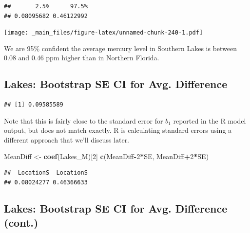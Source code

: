 \documentclass[]{book}
\newenvironment{Shaded}{\begin{snugshade}}{\end{snugshade}}
\newcommand{\KeywordTok}[1]{\textcolor[rgb]{0.13,0.29,0.53}{\textbf{#1}}}
\newcommand{\DecValTok}[1]{\textcolor[rgb]{0.00,0.00,0.81}{#1}}
\newcommand{\StringTok}[1]{\textcolor[rgb]{0.31,0.60,0.02}{#1}}
\newcommand{\OperatorTok}[1]{\textcolor[rgb]{0.81,0.36,0.00}{\textbf{#1}}}
\newcommand{\NormalTok}[1]{#1}
\begin{document}
\begin{verbatim}
##       2.5%      97.5% 
## 0.08095682 0.46122992
\end{verbatim}

\texttt{[image: \_main\_files/figure-latex/unnamed-chunk-240-1.pdf]}

We are 95\% confident the average mercury level in Southern Lakes is
between 0.08 and 0.46 ppm higher than in Northern Florida.

\subsection{Lakes: Bootstrap SE CI for Avg.
Difference}\label{lakes-bootstrap-se-ci-for-avg.-difference}

\begin{Shaded}
\end{Shaded}

\begin{verbatim}
## [1] 0.09585589
\end{verbatim}

Note that this is fairly close to the standard error for \(b_1\)
reported in the R model output, but does not match exactly. R is
calculating standard errors using a different approach that we'll
discuss later.

\begin{Shaded}
\begin{Highlighting}[]
\NormalTok{MeanDiff <-}\StringTok{ }\KeywordTok{coef}\NormalTok{(Lakes_M)[}\DecValTok{2}\NormalTok{]}
\KeywordTok{c}\NormalTok{(MeanDiff}\OperatorTok{-}\DecValTok{2}\OperatorTok{*}\NormalTok{SE, MeanDiff}\OperatorTok{+}\DecValTok{2}\OperatorTok{*}\NormalTok{SE)}
\end{Highlighting}
\end{Shaded}

\begin{verbatim}
##  LocationS  LocationS 
## 0.08024277 0.46366633
\end{verbatim}

\subsection{Lakes: Bootstrap SE CI for Avg. Difference
(cont.)}\label{lakes-bootstrap-se-ci-for-avg.-difference-cont.}
\end{document}
